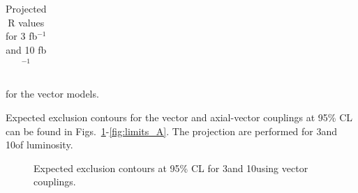 \begin{table}[h!]
\begin{tabular}{llll}
\end{tabular}
\caption{Projected R values for 3 fb$^{-1}$ and 10 fb$^{-1}$} for the vector models.
\label{tab:dm_V_R_values}
\end{table}


Expected exclusion contours for the vector and axial-vector couplings at 95\% CL can be found in Figs.~\ref{fig:limits_V}-\ref{fig:limits_A}. The projection are performed for  3\fbinv and 10\fbinv of luminosity.

\begin{figure}[h!]
  \centering
  \caption{\label{fig:limits_V} Expected exclusion contours at 95\% CL for 3\fbinv and 10\fbinv using vector couplings. }
\end{figure}


